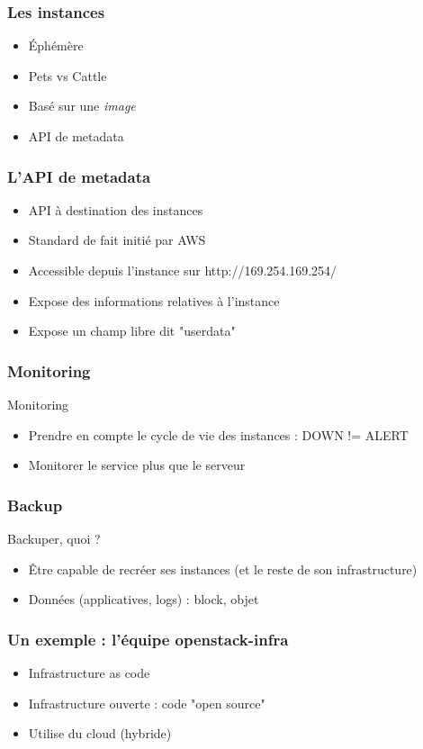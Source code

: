  \begin{frame}
    \frametitle{Les instances}
    \begin{itemize}
      \item Éphémère
      \item Pets vs Cattle
      \item Basé sur une \textit{image}
      \item API de metadata
    \end{itemize}
  \end{frame}

  \begin{frame}
    \frametitle{L'API de metadata}
    \begin{itemize}
      \item API à destination des instances
      \item Standard de fait initié par AWS
      \item Accessible depuis l'instance sur http://169.254.169.254/
      \item Expose des informations relatives à l'instance
      \item Expose un champ libre dit "userdata"
    \end{itemize}
  \end{frame}

  \begin{frame}
    \frametitle{Monitoring}
    Monitoring
    \begin{itemize}
      \item Prendre en compte le cycle de vie des instances : DOWN != ALERT
      \item Monitorer le service plus que le serveur
    \end{itemize}
  \end{frame}

  \begin{frame}
    \frametitle{Backup}
    Backuper, quoi ?
    \begin{itemize}
      \item Être capable de recréer ses instances (et le reste de son infrastructure)
      \item Données (applicatives, logs) : block, objet
    \end{itemize}
  \end{frame}

  \begin{frame}
    \frametitle{Un exemple : l'équipe openstack-infra}
    \begin{itemize}
      \item Infrastructure as code
      \item Infrastructure ouverte : code "open source"
      \item Utilise du cloud (hybride)
    \end{itemize}
  \end{frame}
